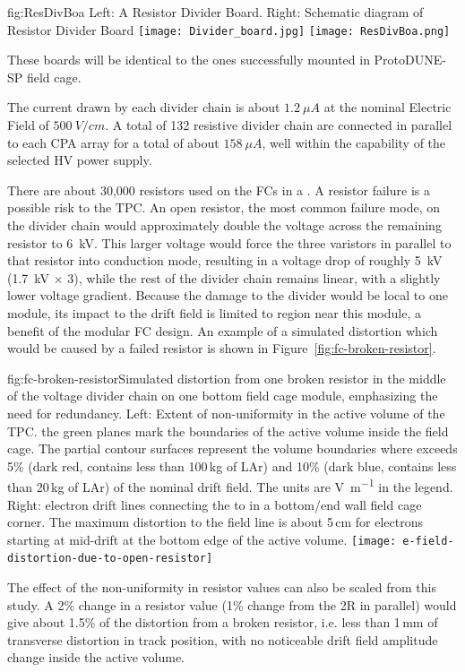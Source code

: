 \begin{dunefigure}{fig:ResDivBoa}
  {Left: A  Resistor Divider Board. Right: Schematic diagram of Resistor Divider Board}
  \texttt{[image: Divider\_board.jpg]}
  \texttt{[image: ResDivBoa.png]}
\end{dunefigure}

These boards will be identical to the ones successfully mounted in ProtoDUNE-SP field cage. 

The current drawn by each divider chain is about $1.2~\mu A$ at the nominal Electric Field of $500~V/cm$. A total of 132 resistive divider chain are connected in parallel to each CPA array for a total of about $158~\mu A$, well within the capability of the selected HV power supply.

There are about 30,000 resistors used on the FCs in a . A resistor failure is a possible risk to the TPC.  
An open resistor, the most common failure mode, on the divider chain would approximately double the voltage across the remaining resistor to \SI{6}{kV}.  This larger voltage would force the three varistors in parallel to that resistor into conduction mode, resulting in a voltage drop of roughly \SI{5}{kV} (\SI{1.7}{kV} $\times$ \num{3}), while the rest of the divider chain remains linear, with a slightly lower voltage gradient. 
Because the damage to the divider would be local to one module, its impact to the  drift field is limited to region near this module, a benefit of the modular FC design.
An example of a simulated \efield{} distortion which would be caused by a failed resistor is shown in Figure~\ref{fig:fc-broken-resistor}. 

\begin{dunefigure}{fig:fc-broken-resistor}{Simulated \efield{} distortion from one broken resistor in the middle of the voltage divider chain on one bottom field cage module, emphasizing the need for redundancy. Left: Extent of \efield{} non-uniformity in the active volume of the TPC. the green planes mark the boundaries of the active volume inside the field cage. The partial contour surfaces represent the volume boundaries where \efield{} exceeds 5\% (dark red, contains less than 100\,kg of LAr) and 10\% (dark blue, contains less than 20\,kg of LAr) of the nominal drift field. The units are \si{\volt\per\m} in the legend. Right: electron drift lines connecting the  to  in a bottom/end wall field cage corner.  The maximum distortion to the field line is about 5\,cm for electrons starting at mid-drift at the bottom edge of the active volume.}
\texttt{[image: e-field-distortion-due-to-open-resistor]}
\end{dunefigure}
The effect of the non-uniformity in resistor values can also be scaled from this study.  A 2\% change in a resistor value (1\% change from the 2R in parallel) would give about 1.5\% of the distortion from a broken resistor, i.e. less than 1\,mm of transverse distortion in track position, with no noticeable drift field amplitude change inside the active volume.
 


